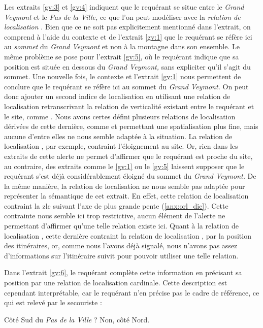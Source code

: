 Les extraits \ref{gv:3} et \ref{gv:4} indiquent que le requérant se
situe entre le \emph{Grand Veymont} et le \emph{Pas de la Ville,} ce
que l'on peut modéliser avec la \emph{relation de localisation}
. Bien que ce ne soit pas explicitement
mentionné dans l'extrait, on comprend à l'aide du contexte et de
l'extrait \ref{gv:1} que le requérant se réfère ici au \emph{sommet}
du \emph{Grand Veymont} et non à la montagne dans son ensemble. Le
même problème se pose pour l'extrait \ref{gv:5}, où le requérant
indique que sa position est située en dessous du \emph{Grand Veymont,}
sans expliciter qu'il s'agit du sommet. Une nouvelle fois, le contexte
et l'extrait \ref{gv:1} nous permettent de conclure que le requérant
se réfère ici au sommet du \emph{Grand Veymont.} On peut donc ajouter
un second indice de localisation en utilisant une relation de
localisation retranscrivant la relation de verticalité existant entre
le requérant et le site, comme . Nous avons
certes défini plusieurs relations de localisation dérivées de cette
dernière, comme  et permettant une
spatialisation plus fine, mais aucune d'entre elles ne nous semble
adaptée à la situation. La relation de localisation
, par exemple, contraint l'éloignement au
site. Or, rien dans les extraits de cette alerte ne permet d'affirmer
que le requérant est proche du site, au contraire, des extraits comme
le \ref{gv:1} ou le \ref{gv:5} laissent supposer que le requérant
s'est déjà considérablement éloigné du sommet du \emph{Grand Veymont.}
De la même manière, la relation de localisation
 ne nous semble pas adaptée pour
représenter la sémantique de cet extrait. En effet, cette relation de
localisation contraint la \ac{zlc} suivant l'axe de plus grande pente
(\autoref{anx:orl_dic}). Cette contrainte nous semble ici trop
restrictive, aucun élément de l'alerte ne permettant d'affirmer qu'une
telle relation existe ici. Quant à la relation de localisation
, cette dernière contraint la
relation de localisation , par la position
des itinéraires, or, comme nous l'avons déjà signalé, nous n'avons pas
assez d'informations sur l'itinéraire suivit pour pouvoir utiliser une
telle relation.

Dans l'extrait \ref{gv:6}, le requérant complète cette information en
précisant sa position par une relation de localisation
cardinale. Cette description est cependant interprétable, car le
requérant n'en précise pas le cadre de référence, ce qui est relevé
par le secouriste :
%
\begin{dialogue*}
  \Sec {} Côté Sud du \emph{Pas de la Ville} ?
%
  \Req {} Non, côté Nord.
\end{dialogue*}

